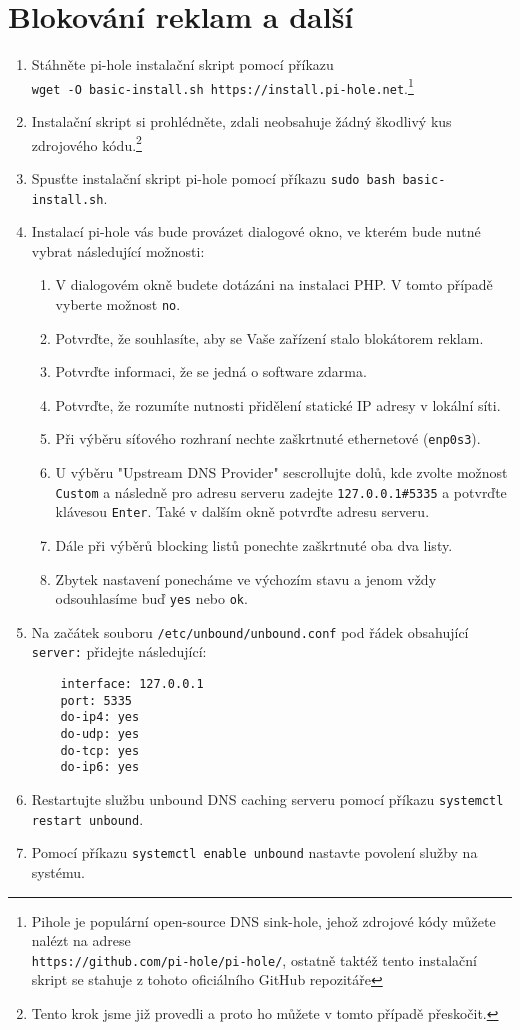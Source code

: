 \section{Blokování reklam a další}
\begin{enumerate}
	\item Stáhněte pi-hole instalační skript pomocí příkazu\\ \texttt{wget -O basic-install.sh https://install.pi-hole.net}.\footnote{Pihole je populární open-source DNS sink-hole, jehož zdrojové kódy můžete nalézt na adrese\\
	\texttt{https://github.com/pi-hole/pi-hole/}, ostatně taktéž tento instalační skript se stahuje z tohoto oficiálního GitHub repozitáře}
	\item Instalační skript si prohlédněte, zdali neobsahuje žádný škodlivý kus zdrojového kódu.\footnote{Tento krok jsme již provedli a proto ho můžete v tomto případě přeskočit.}
	\item Spusťte instalační skript pi-hole pomocí příkazu \texttt{sudo bash basic-install.sh}.
    \item Instalací pi-hole vás bude provázet dialogové okno, ve kterém bude nutné vybrat následující možnosti:
    \begin{enumerate}
        \item V dialogovém okně budete dotázáni na instalaci PHP. V tomto případě vyberte možnost \texttt{no}.
		\item Potvrďte, že souhlasíte, aby se Vaše zařízení stalo blokátorem reklam.
		\item Potvrďte informaci, že se jedná o software zdarma.
		\item Potvrďte, že rozumíte nutnosti přidělení statické IP adresy v lokální síti.
        \item Při výběru síťového rozhraní nechte zaškrtnuté ethernetové (\texttt{enp0s3}).
        \item U výběru "Upstream DNS Provider" sescrollujte dolů, kde zvolte možnost \texttt{Custom} a následně pro adresu serveru zadejte \texttt{127.0.0.1\#5335} a potvrďte klávesou \texttt{Enter}. Také v dalším okně potvrďte adresu serveru.
        \item Dále při výběrů blocking listů ponechte zaškrtnuté oba dva listy.
        \item Zbytek nastavení ponecháme ve výchozím stavu a jenom vždy odsouhlasíme buď \texttt{yes} nebo \texttt{ok}.
    \end{enumerate}
    \item Na začátek souboru \texttt{/etc/unbound/unbound.conf} pod řádek obsahující \texttt{server:} přidejte následující:
\begin{verbatim}
    interface: 127.0.0.1
    port: 5335
    do-ip4: yes
    do-udp: yes
    do-tcp: yes
    do-ip6: yes
\end{verbatim}
    \item Restartujte službu unbound DNS caching serveru pomocí příkazu \texttt{systemctl restart unbound}.
    \item Pomocí příkazu \texttt{systemctl enable unbound} nastavte povolení služby na systému.
	

\end{enumerate}

